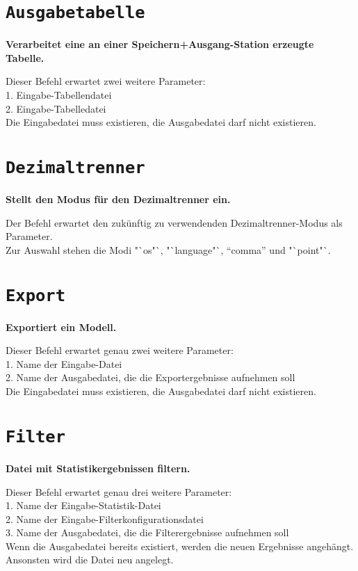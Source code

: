 \section{\texttt{Ausgabetabelle}}

\textbf{Verarbeitet eine an einer Speichern+Ausgang-Station erzeugte Tabelle.}

Dieser Befehl erwartet zwei weitere Parameter:\\
1. Eingabe-Tabellendatei\\
2. Eingabe-Tabelledatei\\
Die Eingabedatei muss existieren, die Ausgabedatei darf nicht existieren.

\section{\texttt{Dezimaltrenner}}

\textbf{Stellt den Modus für den Dezimaltrenner ein.}

Der Befehl erwartet den zukünftig zu verwendenden Dezimaltrenner-Modus als Parameter.\\
Zur Auswahl stehen die Modi "`os"`, "`language"`, "`comma"' und "`point"`.

\section{\texttt{Export}}

\textbf{Exportiert ein Modell.}

Dieser Befehl erwartet genau zwei weitere Parameter:\\
1. Name der Eingabe-Datei\\
2. Name der Ausgabedatei, die die Exportergebnisse aufnehmen soll\\
Die Eingabedatei muss existieren, die Ausgabedatei darf nicht existieren.

\section{\texttt{Filter}}

\textbf{Datei mit Statistikergebnissen filtern.}

Dieser Befehl erwartet genau drei weitere Parameter:\\
1. Name der Eingabe-Statistik-Datei\\
2. Name der Eingabe-Filterkonfigurationsdatei\\
3. Name der Ausgabedatei, die die Filterergebnisse aufnehmen soll\\
Wenn die Ausgabedatei bereits existiert, werden die neuen Ergebnisse angehängt.\\
Ansonsten wird die Datei neu angelegt.


